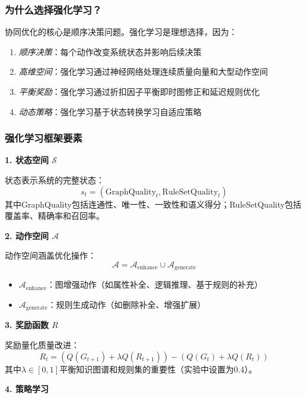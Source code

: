 \documentclass[runningheads]{llncs}
\begin{document}
\subsubsection{为什么选择强化学习？}
协同优化的核心是顺序决策问题。强化学习是理想选择，因为：
\begin{enumerate}
    \item \textit{顺序决策}：每个动作改变系统状态并影响后续决策
    \item \textit{高维空间}：强化学习通过神经网络处理连续质量向量和大型动作空间
    \item \textit{平衡奖励}：强化学习通过折扣因子平衡即时图修正和延迟规则优化
    \item \textit{动态策略}：强化学习基于状态转换学习自适应策略
\end{enumerate}

\subsubsection{强化学习框架要素}

\textbf{1. 状态空间 $\mathcal{S}$}

状态表示系统的完整状态：
\begin{equation}
s_t = (\text{GraphQuality}_t, \text{RuleSetQuality}_t)
\end{equation}
其中GraphQuality包括连通性、唯一性、一致性和语义得分；RuleSetQuality包括覆盖率、精确率和召回率。

\textbf{2. 动作空间 $\mathcal{A}$}

动作空间涵盖优化操作：
\begin{equation}
\mathcal{A} = \mathcal{A}_{\text{enhance}} \cup \mathcal{A}_{\text{generate}}
\end{equation}
\begin{itemize}
    \item $\mathcal{A}_{\text{enhance}}$：图增强动作（如属性补全、逻辑推理、基于规则的补充）
    \item $\mathcal{A}_{\text{generate}}$：规则生成动作（如删除补全、增强扩展）
\end{itemize}

\textbf{3. 奖励函数 $R$}

奖励量化质量改进：
\begin{equation}
\label{eq:reward_def}
R_t = (Q(G_{t+1}) + \lambda Q(R_{t+1})) - (Q(G_t) + \lambda Q(R_t))
\end{equation}
其中$\lambda \in [0,1]$平衡知识图谱和规则集的重要性（实验中设置为0.4）。

\textbf{4. 策略学习}
\end{document}
